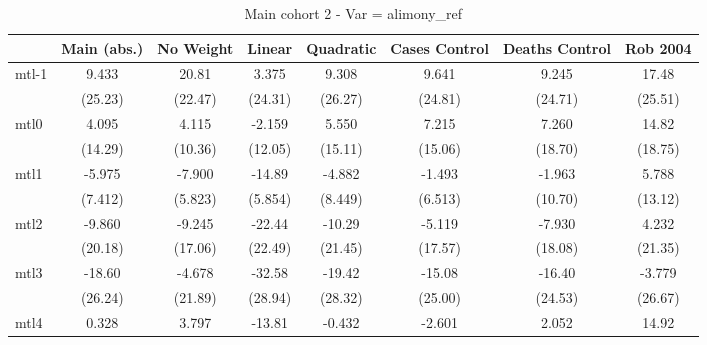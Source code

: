 \documentclass{article}
\begin{document}
{
\def\sym#1{\ifmmode^{#1}\else\(^{#1}\)\fi}
\begin{longtable}{l*{7}{c}}
\caption{Main cohort 2 - Var = alimony\_ref}\\
\hline\hline\endfirsthead\hline\endhead\hline\endfoot\endlastfoot
                &\multicolumn{1}{c}{Main (abs.)}&\multicolumn{1}{c}{No Weight}&\multicolumn{1}{c}{Linear}&\multicolumn{1}{c}{Quadratic}&\multicolumn{1}{c}{Cases Control}&\multicolumn{1}{c}{Deaths Control}&\multicolumn{1}{c}{Rob 2004}\\
\hline
mtl-1           &    9.433         &    20.81         &    3.375         &    9.308         &    9.641         &    9.245         &    17.48         \\
                &  (25.23)         &  (22.47)         &  (24.31)         &  (26.27)         &  (24.81)         &  (24.71)         &  (25.51)         \\
mtl0            &    4.095         &    4.115         &   -2.159         &    5.550         &    7.215         &    7.260         &    14.82         \\
                &  (14.29)         &  (10.36)         &  (12.05)         &  (15.11)         &  (15.06)         &  (18.70)         &  (18.75)         \\
mtl1            &   -5.975         &   -7.900         &   -14.89         &   -4.882         &   -1.493         &   -1.963         &    5.788         \\
                &  (7.412)         &  (5.823)         &  (5.854)         &  (8.449)         &  (6.513)         &  (10.70)         &  (13.12)         \\
mtl2            &   -9.860         &   -9.245         &   -22.44         &   -10.29         &   -5.119         &   -7.930         &    4.232         \\
                &  (20.18)         &  (17.06)         &  (22.49)         &  (21.45)         &  (17.57)         &  (18.08)         &  (21.35)         \\
mtl3            &   -18.60         &   -4.678         &   -32.58         &   -19.42         &   -15.08         &   -16.40         &   -3.779         \\
                &  (26.24)         &  (21.89)         &  (28.94)         &  (28.32)         &  (25.00)         &  (24.53)         &  (26.67)         \\
mtl4            &    0.328         &    3.797         &   -13.81         &   -0.432         &   -2.601         &    2.052         &    14.92         \\

\end{longtable}}
\end{document}
